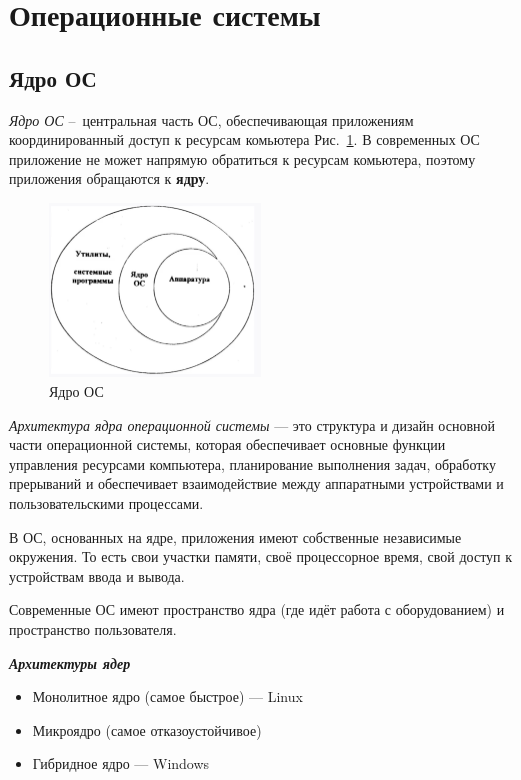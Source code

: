\documentclass[oneside, final, 14pt]{extreport} %
\begin{document}
\section{Операционные системы}

\subsection{Ядро ОС}

\textit{Ядро ОС} – центральная часть ОС, обеспечивающая приложениям 
координированный доступ к ресурсам комьютера Рис.~\ref{fig:3}. 
В современных ОС приложение не может напрямую обратиться 
к ресурсам комьютера, поэтому приложения обращаются к \textbf{ядру}.

\begin{figure}[ht]
    \centering
    \includegraphics[width=0.5\textwidth]{3.png}
    \caption{Ядро ОС}
    \label{fig:3}
\end{figure}

\textit{Архитектура ядра операционной системы} --- это структура и дизайн основной части операционной системы, которая обеспечивает основные функции управления ресурсами компьютера, планирование выполнения задач, обработку прерываний и обеспечивает взаимодействие между аппаратными устройствами и пользовательскими процессами.

В ОС, основанных на ядре, приложения имеют собственные независимые окружения. То есть
свои участки памяти, своё процессорное время, свой доступ к устройствам 
ввода и вывода.


Современные ОС имеют пространство ядра (где идёт работа с оборудованием)
и пространство пользователя.

\textit{\textbf{Архитектуры ядер}}
\begin{itemize}
    \item Монолитное ядро (самое быстрое) --- Linux
    \item Микроядро (самое отказоустойчивое)
    \item Гибридное ядро --- Windows
\end{itemize}
\end{document}
